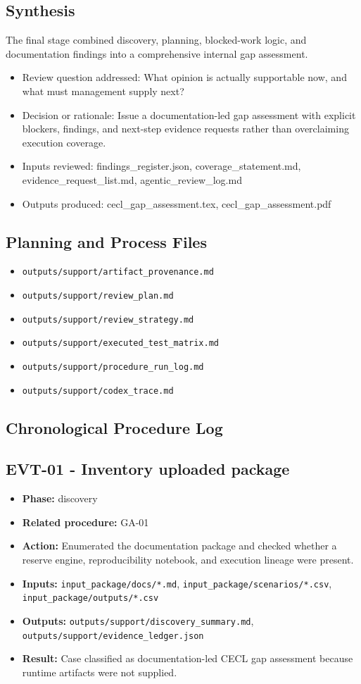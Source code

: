 \documentclass[11pt]{article}
\begin{document}
\subsection*{Synthesis}
The final stage combined discovery, planning, blocked-work logic, and documentation findings into a comprehensive internal gap assessment.
\begin{itemize}
\item Review question addressed: What opinion is actually supportable now, and what must management supply next?
\item Decision or rationale: Issue a documentation-led gap assessment with explicit blockers, findings, and next-step evidence requests rather than overclaiming execution coverage.
\item Inputs reviewed: findings\_register.json, coverage\_statement.md, evidence\_request\_list.md, agentic\_review\_log.md
\item Outputs produced: cecl\_gap\_assessment.tex, cecl\_gap\_assessment.pdf
\end{itemize}
\subsection*{Planning and Process Files}
\begin{itemize}
\item \texttt{outputs/support/artifact\_provenance.md}
\item \texttt{outputs/support/review\_plan.md}
\item \texttt{outputs/support/review\_strategy.md}
\item \texttt{outputs/support/executed\_test\_matrix.md}
\item \texttt{outputs/support/procedure\_run\_log.md}
\item \texttt{outputs/support/codex\_trace.md}
\end{itemize}
\subsection*{Chronological Procedure Log}
\subsection*{EVT-01 - Inventory uploaded package}
\begin{itemize}
\item \textbf{Phase:} discovery
\item \textbf{Related procedure:} GA-01
\item \textbf{Action:} Enumerated the documentation package and checked whether a reserve engine, reproducibility notebook, and execution lineage were present.
\item \textbf{Inputs:} \texttt{input\_package/docs/*.md}, \texttt{input\_package/scenarios/*.csv}, \texttt{input\_package/outputs/*.csv}
\item \textbf{Outputs:} \texttt{outputs/support/discovery\_summary.md}, \texttt{outputs/support/evidence\_ledger.json}
\item \textbf{Result:} Case classified as documentation-led CECL gap assessment because runtime artifacts were not supplied.
\end{itemize}
\end{document}
